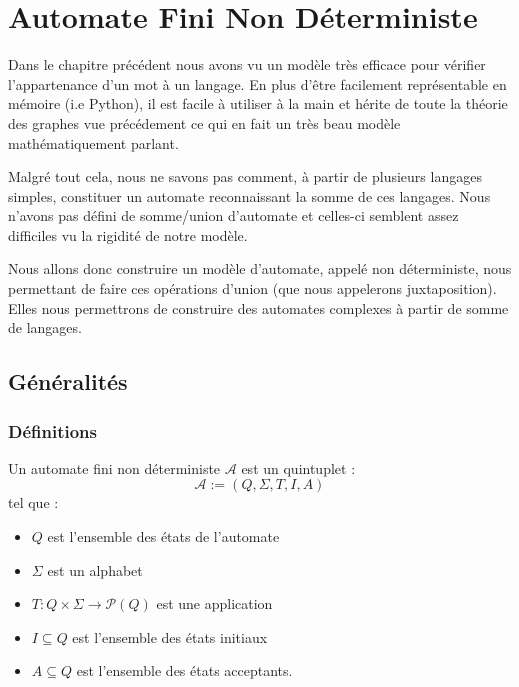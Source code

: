 \chapter{Automate Fini Non Déterministe}

\minitoc %

\setlength{\parindent}{0pt}
\renewcommand{\labelitemi}{\textbullet} %



Dans le chapitre précédent nous avons vu un modèle très efficace pour vérifier l'appartenance d'un mot à un langage. 
En plus d'être facilement représentable en mémoire (i.e Python), il est facile à utiliser à la main et 
hérite de toute la théorie des graphes vue précédement ce qui en fait un très beau modèle mathématiquement parlant. 

Malgré tout cela, nous ne savons pas comment, à partir de plusieurs langages simples, constituer un automate 
reconnaissant la somme de ces langages. Nous n'avons pas défini de somme/union d'automate et celles-ci semblent 
assez difficiles vu la rigidité de notre modèle. 

Nous allons donc construire un modèle d'automate, appelé non déterministe, nous permettant de faire ces opérations 
d'union (que nous appelerons juxtaposition). Elles nous permettrons de construire des automates complexes à partir de 
somme de langages. 


\section{Généralités}

\subsection{Définitions}

\begin{definition}[AFN]
    Un automate fini non déterministe $ \mathcal{A}$ est un quintuplet : 
        \[ \mathcal{A} := (Q,\Sigma, T,I,A) \] 
    tel que :
    \begin{itemize}
        \item $Q$ est l'ensemble des états de l'automate 
        \item $\Sigma$ est un alphabet 
        \item $T : Q \times \Sigma \longrightarrow \mathcal{P}(Q)$ est une application 
        \item $I \subseteq Q$ est l'ensemble des états initiaux 
        \item $A \subseteq Q$ est l'ensemble des états acceptants. 
    \end{itemize}
\end{definition}

